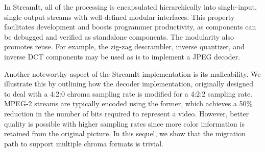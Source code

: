 In StreamIt, all of the processing is encapsulated hierarchically into
single-input, single-output streams with well-defined modular
interfaces. This property facilitates development and boosts
programmer productivity, as components can be debugged and verified as
standalone components. The modularity also promotes reuse. For
example, the zig-zag descrambler, inverse quantizer, and inverse DCT
components may be used as is to implement a JPEG decoder.

Another noteworthy aspect of the StreamIt implementation is its
malleability. We illustrate this by outlining how the decoder
implementation, originally designed to deal with a 4:2:0 chroma
sampling rate is modified for a 4:2:2 sampling rate. MPEG-2 streams
are typically encoded using the former, which achieves a 50\%
reduction in the number of bits required to represent a
video. However, better quality is possible with higher sampling rates
since more color information is retained from the original picture. In
this sequel, we show that the migration path to support multiple
chroma formats is trivial.








